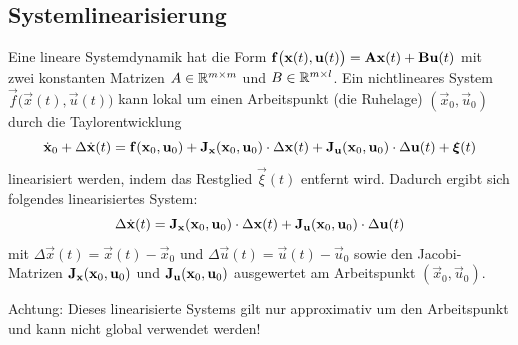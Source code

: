 		\subsection{Systemlinearisierung}
			Eine lineare Systemdynamik hat die Form \( \boldsymbol{\mathrm{f}}\big(\boldsymbol{\mathrm{x}}(t), \boldsymbol{\mathrm{u}}(t)\big) = \boldsymbol{\mathrm{A}} \boldsymbol{\mathrm{x}}(t) + \boldsymbol{\mathrm{B}} \boldsymbol{\mathrm{u}}(t) \) mit zwei konstanten Matrizen \( A \in \mathbb{R}^{m \times m} \) und \( B \in \mathbb{R}^{m \times l} \). Ein nichtlineares System \( \vec{f}\big(\vec{x}(t), \vec{u}(t)\big) \) kann lokal um einen Arbeitspunkt (\bspw die Ruhelage) \( (\vec{x}_0, \vec{u}_0) \) durch die Taylorentwicklung
			\begin{equation*}
				\dot{\boldsymbol{\mathrm{x}}}_0 + \Delta\dot{\boldsymbol{\mathrm{x}}}(t) = \boldsymbol{\mathrm{f}}(\boldsymbol{\mathrm{x}}_0, \boldsymbol{\mathrm{u}}_0) + \boldsymbol{\mathrm{J}}_{\boldsymbol{\mathrm{x}}}(\boldsymbol{\mathrm{x}}_0, \boldsymbol{\mathrm{u}}_0) \cdot \Delta\boldsymbol{\mathrm{x}}(t) + \boldsymbol{\mathrm{J}}_{\boldsymbol{\mathrm{u}}}(\boldsymbol{\mathrm{x}}_0, \boldsymbol{\mathrm{u}}_0) \cdot \Delta\boldsymbol{\mathrm{u}}(t) + \boldsymbol{\mathrm{\xi}}(t)
			\end{equation*}
			linearisiert werden, indem das Restglied \(\vec{\xi}(t)\) entfernt wird. Dadurch ergibt sich folgendes linearisiertes System:
			\begin{equation*}
				\Delta\dot{\boldsymbol{\mathrm{x}}}(t) = \boldsymbol{\mathrm{J}}_{\boldsymbol{\mathrm{x}}}(\boldsymbol{\mathrm{x}}_0, \boldsymbol{\mathrm{u}}_0) \cdot \Delta\boldsymbol{\mathrm{x}}(t) + \boldsymbol{\mathrm{J}}_{\boldsymbol{\mathrm{u}}}(\boldsymbol{\mathrm{x}}_0, \boldsymbol{\mathrm{u}}_0) \cdot \Delta\boldsymbol{\mathrm{u}}(t)
			\end{equation*}
			mit \( \Delta\vec{x}(t) = \vec{x}(t) - \vec{x}_0 \) und \( \Delta\vec{u}(t) = \vec{u}(t) - \vec{u}_0 \) sowie den Jacobi-Matrizen \( \boldsymbol{\mathrm{J}}_{\boldsymbol{\mathrm{x}}}(\boldsymbol{\mathrm{x}}_0, \boldsymbol{\mathrm{u}}_0) \) und \( \boldsymbol{\mathrm{J}}_{\boldsymbol{\mathrm{u}}}(\boldsymbol{\mathrm{x}}_0, \boldsymbol{\mathrm{u}}_0) \) ausgewertet am Arbeitspunkt \( (\vec{x}_0, \vec{u}_0) \).
			
			Achtung: Dieses linearisierte Systems gilt nur approximativ um den Arbeitspunkt und kann nicht global verwendet werden!

